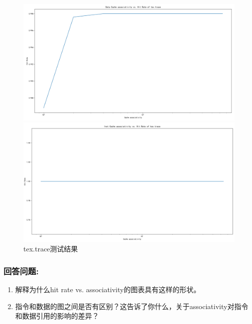 \documentclass[12pt,hyperref,a4paper,UTF8]{ctexart}
\begin{document}
\begin{figure}[H]
    \centering
    \begin{minipage}[b]{0.45\textwidth}
        \centering
        \includegraphics[width=\textwidth]{./figures/fig/image31.png}
    \end{minipage}
    \hfill
    \begin{minipage}[b]{0.45\textwidth}
        \centering
        \includegraphics[width=\textwidth]{./figures/fig/image32.png}
    \end{minipage}
    \caption{tex.trace测试结果}
\end{figure}



\subsubsection*{回答问题:}
\begin{enumerate}
    \item 解释为什么hit rate vs. associativity的图表具有这样的形状。
    \item 指令和数据的图之间是否有区别？这告诉了你什么，关于associativity对指令和数据引用的影响的差异？
\end{enumerate}
\end{document}
